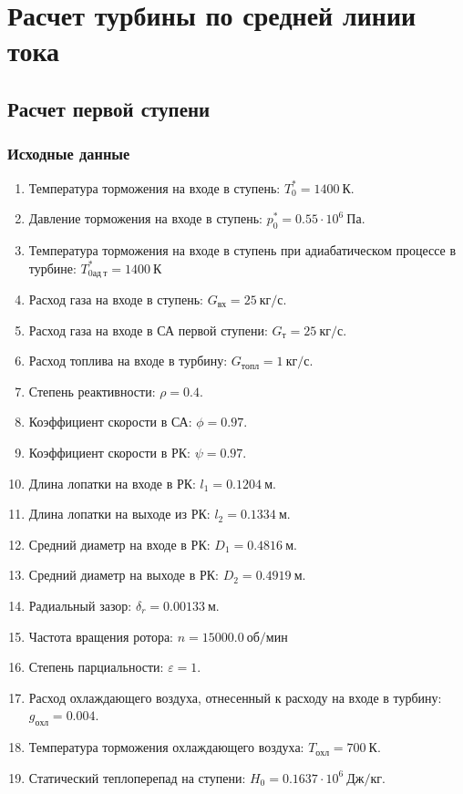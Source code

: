 \documentclass[a4paper,10pt]{article}
\begin{document}
    \section{Расчет турбины по средней линии тока}

    
    

    \subsection{Расчет первой ступени}

    \subsubsection{Исходные данные}

    
    \begin{enumerate}

        \item Температура торможения на входе в ступень: $T_0^* = 1400\ К $.
        \item Давление торможения на входе в ступень: $p_0^* = 0.55 \cdot 10^6 \ Па$.
        \item Температура торможения на входе в ступень при адиабатическом процессе в турбине: $T_{0ад\ т}^* = 1400\ К$
        \item Расход газа на входе в ступень: $G_{вх} = 25\ кг/с$.
        \item Расход газа на входе в СА первой ступени: $ G_т = 25\ кг/с $.
        \item Расход топлива на входе в турбину: $ G_{топл} = 1\ кг/с $.
        \item Степень реактивности: $ \rho = 0.4 $.
        \item Коэффициент скорости в СА: $ \phi = 0.97 $.
        \item Коэффициент скорости в РК: $ \psi = 0.97 $.
        \item Длина лопатки на входе в РК: $ l_1 = 0.1204\ м $.
        \item Длина лопатки на выходе из РК: $ l_2 = 0.1334\ м $.
        \item Средний диаметр на входе в РК: $ D_1 = 0.4816\ м $.
        \item Средний диаметр на выходе в РК: $ D_2 = 0.4919\ м $.
        \item Радиальный зазор: $ \delta_r = 0.00133\ м $.
        \item Частота вращения ротора: $ n = 15000.0\ об/мин $
        \item Степень парциальности: $ \varepsilon = 1 $.
        \item Расход охлаждающего воздуха, отнесенный к расходу на входе в турбину: $ g_{охл} = 0.004 $.
        \item Температура торможения охлаждающего воздуха: $ T_{охл} = 700\ К $.

        
        \item Статический теплоперепад на ступени: $ H_0 = 0.1637 \cdot 10^6 \ Дж/кг $.

        

    \end{enumerate}
    
\end{document}

